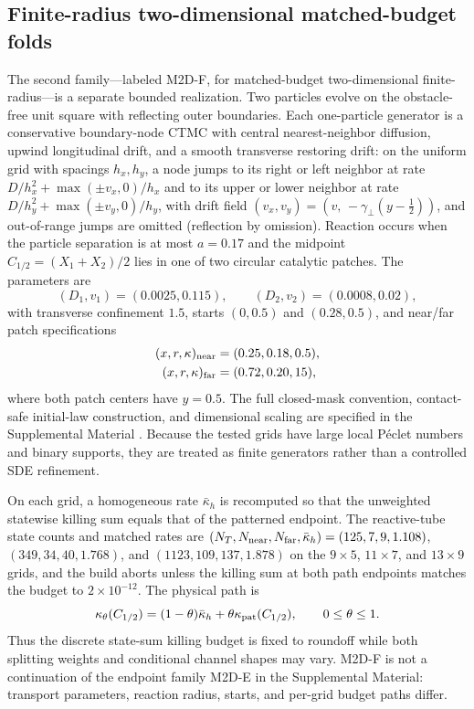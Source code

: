 \documentclass[aps,pre,reprint,amsmath,amssymb,longbibliography,floatfix]{revtex4-2}
\begin{document}
\subsection{Finite-radius two-dimensional matched-budget folds}
\label{sec:2d-fold-continuation}

The second family---labeled M2D-F, for matched-budget two-dimensional finite-radius---is a separate bounded realization. Two
particles evolve on the obstacle-free unit square with reflecting outer
boundaries. Each one-particle generator is a conservative boundary-node CTMC
with central nearest-neighbor diffusion, upwind longitudinal drift, and a
smooth transverse restoring drift: on the uniform grid with spacings
\(h_x,h_y\), a node jumps to its right or left neighbor at rate
\(D/h_x^2+\max(\pm v_x,0)/h_x\) and to its upper or lower neighbor at rate
\(D/h_y^2+\max(\pm v_y,0)/h_y\), with drift field
\((v_x,v_y)=(v,\,-\gamma_\perp(y-\tfrac12))\), and out-of-range jumps are
omitted (reflection by omission). Reaction occurs when the particle
separation is at most \(a=0.17\) and the midpoint
\(C_{1/2}=(X_1+X_2)/2\) lies in one of two circular catalytic patches.
The parameters are
\[
(D_1,v_1)=(0.0025,0.115),\qquad
(D_2,v_2)=(0.0008,0.02),
\]
with transverse confinement \(1.5\), starts \((0,0.5)\) and
\((0.28,0.5)\), and near/far patch specifications
\begin{align*}
(x,r,\kappa)_{\rm near}&=(0.25,0.18,0.5),\\
(x,r,\kappa)_{\rm far}&=(0.72,0.20,15),
\end{align*}
where both patch centers have \(y=0.5\). The full closed-mask convention,
contact-safe initial-law construction, and dimensional scaling are specified
in the Supplemental Material \cite{supplementalMaterial}. Because the tested
grids have large local P\'eclet numbers and binary supports, they are treated
as finite generators rather than a controlled SDE refinement.

On each grid, a homogeneous rate \(\bar\kappa_h\) is recomputed so that the
unweighted statewise killing sum equals that of the patterned endpoint. The
reactive-tube state counts and matched rates are
\((N_T,N_{\rm near},N_{\rm far},\bar\kappa_h)=(125,7,9,1.108)\),
\((349,34,40,1.768)\), and \((1123,109,137,1.878)\) on the
\(9\times5\), \(11\times7\), and \(13\times9\) grids, and the build
aborts unless the killing sum at both path endpoints matches the budget to
\(2\times10^{-12}\). The
physical path is
\begin{equation}
\kappa_\theta(C_{1/2})=(1-\theta)\bar\kappa_h
+\theta\kappa_{\rm pat}(C_{1/2}),
\qquad 0\leq\theta\leq1.
\label{eq:2d-budget-path}
\end{equation}
Thus the discrete state-sum killing budget is fixed to roundoff while both
splitting weights and conditional channel shapes may vary. M2D-F is not a
continuation of the endpoint family M2D-E in the Supplemental Material:
transport parameters, reaction radius, starts, and per-grid budget paths
differ.
\end{document}
